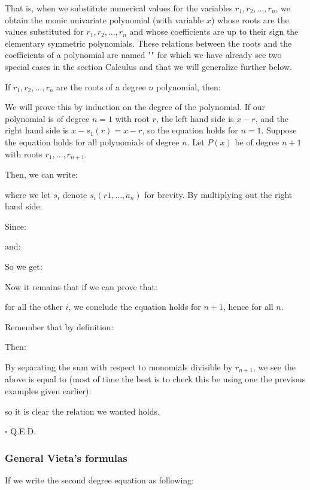	That is, when we substitute numerical values for the variables $r_1,r_2,\dots,r_n$, we obtain the monic univariate polynomial (with variable $x$) whose roots are the values substituted for $r_1,r_2,\dots,r_n$ and whose coefficients are up to their sign the elementary symmetric polynomials. These relations between the roots and the coefficients of a polynomial are named "" for which we have already see two special cases in the section Calculus and that we will generalize further below.
	\begin{theorem}
	If $r_1,r_2,\ldots, r_n$ are the roots of a degree $n$ polynomial, then:
	
	\end{theorem}
	\begin{dem}
	We will prove this by induction on the degree of the polynomial. If our polynomial is of degree $n = 1$ with root $r$, the left hand side is $x-r$, and the right hand side is $x-s_1(r)= x-r$, so the equation holds for $n = 1$. Suppose the equation holds for all polynomials of degree $n$. Let $P(x)$ be of degree $n+1$ with roots $r_1,\ldots,r_{n+1}$.

    Then, we can write:
    
	where we let $s_i$ denote $s_i(r1, \ldots , a_n)$ for brevity. By multiplying out the right hand side:
	
	Since:
	
	and:
	
	So we get:
	
	Now it remains that if we can prove that:
	
	for all the other $i$, we conclude the equation holds for $n+1$, hence for all $n$.
	
	Remember that by definition:
	
	Then:
	
	By separating the sum with respect to monomials divisible by $r_{n+1}$, we see the above is equal to (most of time the best is to check this be using one the previous examples given earlier):
	
	so it is clear the relation we wanted holds.
	\begin{flushright}
		$\square$  Q.E.D.
	\end{flushright}
	\end{dem}
	
	\subsubsection{General Vieta's formulas}
	If we write the second degree equation as following:
	
